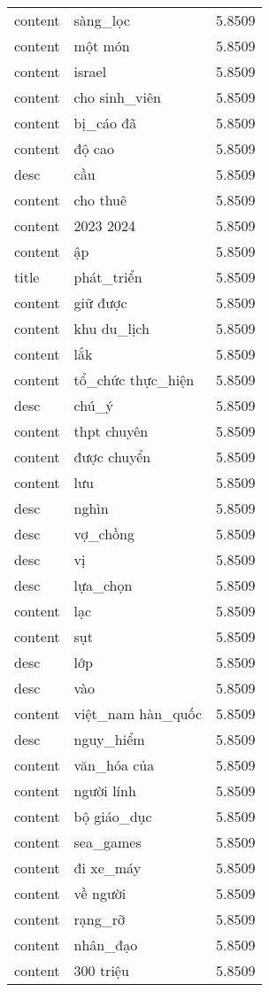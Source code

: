 \documentclass{article}
\begin{document}
\begin{tabular}{lll}
content & sàng\_lọc & 5.8509\\
content & một món & 5.8509\\
content & israel & 5.8509\\
content & cho sinh\_viên & 5.8509\\
content & bị\_cáo đã & 5.8509\\
content & độ cao & 5.8509\\
desc & cầu & 5.8509\\
content & cho thuê & 5.8509\\
content & 2023 2024 & 5.8509\\
content & ập & 5.8509\\
title & phát\_triển & 5.8509\\
content & giữ được & 5.8509\\
content & khu du\_lịch & 5.8509\\
content & lắk & 5.8509\\
content & tổ\_chức thực\_hiện & 5.8509\\
desc & chú\_ý & 5.8509\\
content & thpt chuyên & 5.8509\\
content & được chuyển & 5.8509\\
content & lưu & 5.8509\\
desc & nghìn & 5.8509\\
desc & vợ\_chồng & 5.8509\\
desc & vị & 5.8509\\
desc & lựa\_chọn & 5.8509\\
content & lạc & 5.8509\\
content & sụt & 5.8509\\
desc & lớp & 5.8509\\
desc & vào & 5.8509\\
content & việt\_nam hàn\_quốc & 5.8509\\
desc & nguy\_hiểm & 5.8509\\
content & văn\_hóa của & 5.8509\\
content & người lính & 5.8509\\
content & bộ giáo\_dục & 5.8509\\
content & sea\_games & 5.8509\\
content & đi xe\_máy & 5.8509\\
content & về người & 5.8509\\
content & rạng\_rỡ & 5.8509\\
content & nhân\_đạo & 5.8509\\
content & 300 triệu & 5.8509\\

\end{tabular}
\end{document}

